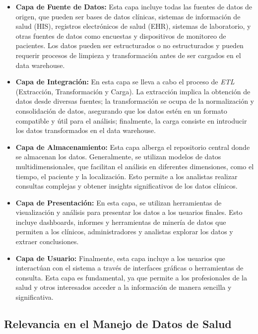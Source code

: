 \documentclass[12pt, a4paper, twoside]{article}
\begin{document}
	\begin{itemize}
		\item \textbf{Capa de Fuente de Datos:} Esta capa incluye todas las fuentes de datos de origen, que pueden ser bases de datos clínicas, sistemas de información de salud (HIS), registros electrónicos de salud (EHR), sistemas de laboratorio, y otras fuentes de datos como encuestas y dispositivos de monitoreo de pacientes. Los datos pueden ser estructurados o no estructurados y pueden requerir procesos de limpieza y transformación antes de ser cargados en el data warehouse.
		
		\item \textbf{Capa de Integración:} En esta capa se lleva a cabo el proceso de \textit{ETL} (Extracción, Transformación y Carga). La extracción implica la obtención de datos desde diversas fuentes; la transformación se ocupa de la normalización y consolidación de datos, asegurando que los datos estén en un formato compatible y útil para el análisis; finalmente, la carga consiste en introducir los datos transformados en el data warehouse.
		
		\item \textbf{Capa de Almacenamiento:} Esta capa alberga el repositorio central donde se almacenan los datos. Generalmente, se utilizan modelos de datos multidimensionales, que facilitan el análisis en diferentes dimensiones, como el tiempo, el paciente y la localización. Esto permite a los analistas realizar consultas complejas y obtener insights significativos de los datos clínicos.
		
		\item \textbf{Capa de Presentación:} En esta capa, se utilizan herramientas de visualización y análisis para presentar los datos a los usuarios finales. Esto incluye dashboards, informes y herramientas de minería de datos que permiten a los clínicos, administradores y analistas explorar los datos y extraer conclusiones. 
		
		\item \textbf{Capa de Usuario:} Finalmente, esta capa incluye a los usuarios que interactúan con el sistema a través de interfaces gráficas o herramientas de consulta. Esta capa es fundamental, ya que permite a los profesionales de la salud y otros interesados acceder a la información de manera sencilla y significativa.
	\end{itemize}
	
	\subsection{Relevancia en el Manejo de Datos de Salud}
\end{document}
